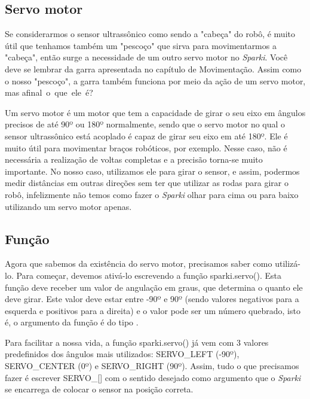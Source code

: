 \documentclass[conference]{IEEEtran}
\begin{document}
\begin{center}
    \subsection{Servo motor}    
\end{center}
    \par
    Se considerarmos o sensor ultrassônico como sendo a "cabeça" do robô, é muito útil que tenhamos também um "pescoço" que sirva para movimentarmos a "cabeça", então surge a necessidade de um outro servo motor no \textit{Sparki}. Você deve se lembrar da garra apresentada no capítulo de Movimentação. Assim como o nosso "pescoço", a garra também funciona por meio da ação de um servo motor, mas afinal o que ele é?
    \par
    Um servo motor é um motor que tem a capacidade de girar o seu eixo em ângulos precisos de até 90º ou 180º normalmente, sendo que o servo motor no qual o sensor ultrassônico está acoplado é capaz de girar seu eixo em até 180º. Ele é muito útil para movimentar braços robóticos, por exemplo. Nesse caso, não é necessária a realização de voltas completas e a precisão torna-se muito importante. No nosso caso, utilizamos ele para girar o sensor, e assim, podermos medir distâncias em outras direções sem ter que utilizar as rodas para girar o robô, infelizmente não temos como fazer o \textit{Sparki} olhar para cima ou para baixo utilizando um servo motor apenas.
\begin{center}
    \subsection{Função}    
\end{center}
    \par
    Agora que sabemos da existência do servo motor, precisamos saber como utilizá-lo. Para começar, devemos ativá-lo escrevendo a função { \selectfont sparki.servo()}. Esta função deve receber um valor de angulação em graus, que determina o quanto ele deve girar. Este valor deve estar entre -90º e 90º (sendo valores negativos para a esquerda e positivos para a direita) e o valor pode ser um número quebrado, isto é, o argumento da função é do tipo {}.
    \par
    Para facilitar a nossa vida, a função { \selectfont sparki.servo()} já vem com 3 valores predefinidos dos ângulos mais utilizados: { \selectfont SERVO\_LEFT} (-90º), { \selectfont SERVO\_CENTER} (0º) e { \selectfont SERVO\_RIGHT} (90º). Assim, tudo o que precisamos fazer é escrever { \selectfont SERVO\_[]} com o sentido desejado como argumento que o \textit{Sparki} se encarrega de colocar o sensor na posição correta.
\end{document}
